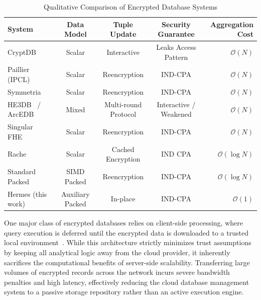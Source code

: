 \documentclass[sigconf,nonacm]{acmart}
\begin{document}
\begin{table}[t]
\centering
\caption{Qualitative Comparison of Encrypted Database Systems}
\label{tab:qualitative_comparison}
\begin{tabular}{lcccr}
\toprule
System & Data Model & Tuple Update & Security Guarantee & Aggregation Cost \\
\midrule
CryptDB~\cite{popa2011cryptdb} & Scalar & Interactive & Leaks Access Pattern & $\mathcal{O}(N)$ \\
Paillier (IPCL)~\cite{ipcl_github} & Scalar & Reencryption & IND-CPA & $\mathcal{O}(N)$ \\
Symmetria~\cite{symmetria_vldb20} & Scalar & Reencryption & IND-CPA & $\mathcal{O}(N)$ \\
HE3DB~\cite{10.1145/3576915.3616608} / ArcEDB~\cite{10.1145/3658644.3670384} & Mixed & Multi-round Protocol & Interactive / Weakened & $\mathcal{O}(N)$ \\
Singular FHE~\cite{BGV2014} & Scalar & Reencryption & IND-CPA & $\mathcal{O}(N)$ \\
Rache~\cite{otawose_sigmod23} & Scalar & Cached Encryption & IND CPA & $\mathcal{O}(\log N)$ \\
Standard Packed~\cite{BGV2014} & SIMD Packed & Reencryption & IND-CPA & $\mathcal{O}(\log N)$ \\
\midrule
Hermes (this work) & Auxiliary Packed & In-place & IND-CPA & $\mathcal{O}(1)$ \\
\bottomrule
\end{tabular}
\end{table}

One major class of encrypted databases relies on client-side processing, where query execution is deferred until the encrypted data is downloaded to a trusted local environment~\cite{akavia_sec23}. While this architecture strictly minimizes trust assumptions by keeping all analytical logic away from the cloud provider, it inherently sacrifices the computational benefits of server-side scalability. Transferring large volumes of encrypted records across the network incurs severe bandwidth penalties and high latency, effectively reducing the cloud database management system to a passive storage repository rather than an active execution engine.
\end{document}
